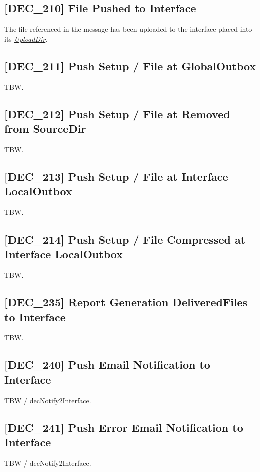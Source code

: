 \documentclass[dec_sum_main.tex]{subfiles}
\begin{document}
\label{DEC210}
\subsection{[DEC\_210] File Pushed to Interface}
The file referenced in the message has been uploaded to the interface placed into its \hyperref[Upload Rules]{\textit{UploadDir}}.

\label{DEC211}
\subsection{[DEC\_211] Push Setup / File at GlobalOutbox}
TBW.

\label{DEC212}
\subsection{[DEC\_212] Push Setup / File at Removed from SourceDir}
TBW.

\label{DEC213}
\subsection{[DEC\_213] Push Setup / File at Interface LocalOutbox}
TBW.

\label{DEC214}
\subsection{[DEC\_214] Push Setup / File Compressed at Interface LocalOutbox}
TBW.

\label{DEC235}
\subsection{[DEC\_235] Report Generation DeliveredFiles to Interface}
TBW.

\label{DEC240}
\subsection{[DEC\_240] Push Email Notification to Interface}
TBW / decNotify2Interface.

\label{DEC241}
\subsection{[DEC\_241] Push Error Email Notification to Interface}
TBW / decNotify2Interface.

\label{DEC244}
\end{document}
